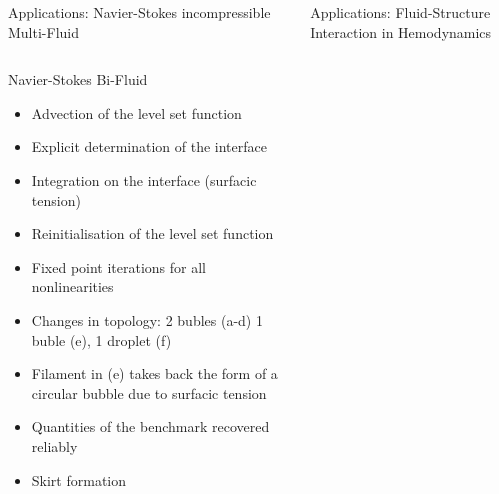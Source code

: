 \documentclass[final,utf8,,hyperref={pdfpagelabels=false}]{beamer}
\begin{document}
\begin{frame}[containsverbatim]{}
\begin{columns}[t]
\begin{block}{Applications: Navier-Stokes incompressible Multi-Fluid}
\begin{columns}[t]
\begin{column}{.52\textwidth}
\begin{block}{Navier-Stokes Bi-Fluid}
\begin{itemize}
            \item Advection of the level set function
            \item Explicit determination of the interface
            \item Integration on the interface (surfacic tension)
            \item Reinitialisation of the  level set function
              
            \item Fixed point iterations for all nonlinearities
              
            \item Changes in topology: 2 bubles (a-d) 1 buble (e), 1 droplet (f)
            \item Filament in (e) takes back the form of a circular bubble due
              to surfacic tension

            \item Quantities of the benchmark recovered reliably
            \item Skirt formation
            \end{itemize}
          \end{block}
        \end{column}
      \end{columns}

  \end{block}

  \begin{block}{Applications: Fluid-Structure Interaction in Hemodynamics}
    

\end{block}
\end{columns}
\end{frame}
\end{document}
